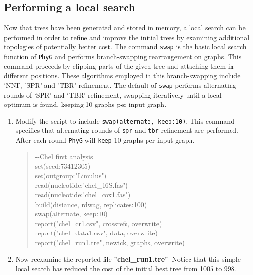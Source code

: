 \documentclass[11pt]{article}
\newcommand{\phyg}{\texttt{PhyG} }
\begin{document}
\subsection{Performing a local search}
\label{subsec:localsearch}

Now that trees have been generated and stored in memory, a local search can be 
performed in order to refine and improve the initial trees by examining additional 
topologies of potentially better cost. The command \texttt{swap} is the basic local 
search function of \phyg and performs branch-swapping rearrangement on graphs. 
This command proceeds by clipping parts of the given tree and attaching them in 
different positions. These algorithms employed in this branch-swapping include 
`NNI', `SPR' and `TBR' refinement. The default of \texttt{swap} performs alternating 
rounds of `SPR' and `TBR' refinement, swapping iteratively until a local optimum 
is found, keeping 10 graphs per input graph.

\begin{enumerate}

\item Modify the script to include \texttt{swap(alternate, keep:10)}. This command 
specifies that alternating rounds of \texttt{spr} and \texttt{tbr} refinement are performed. 
After each round \phyg will \texttt{keep} 10 graphs per input graph.

	\begin{quote}
	-\/-Chel first analysis\\
	set(seed:73412305)\\
	set(outgroup:"Limulus")\\
	read(nucleotide:"chel\_16S.fas")\\
	read(nucleotide:"chel\_cox1.fas")\\
	build(distance, rdwag, replicates:100)\\
	swap(alternate, keep:10)\\
	report("chel\_cr1.csv", crossrefs, overwrite)\\
	report("chel\_data1.csv", data, overwrite)\\
	report("chel\_run1.tre", newick, graphs, overwrite)\\
	\end{quote}
	
\item Now reexamine the reported file \textbf{"chel\_run1.tre"}. Notice that this 
simple local search has reduced the cost of the initial best tree from 1005 to 998.

\end{enumerate}
\end{document}
